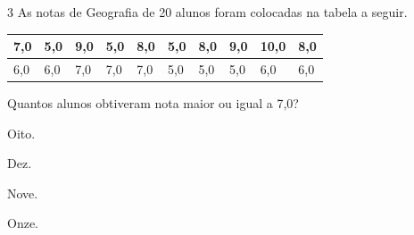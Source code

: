 



\num{3} As notas de Geografia de 20 alunos foram colocadas na tabela a seguir.


\begin{longtable}[]{@{}llllllllll@{}}
\toprule
7,0 & 5,0 & 9,0 & 5,0 & 8,0 & 5,0 & 8,0 & 9,0 & 10,0 &
8,0\tabularnewline
\midrule
\endhead
6,0 & 6,0 & 7,0 & 7,0 & 7,0 & 5,0 & 5,0 & 5,0 & 6,0 & 6,0\tabularnewline
\bottomrule
\end{longtable}

Quantos alunos obtiveram nota maior ou igual a 7,0?

\begin{escolha}
\item Oito.
\item Dez.
\item Nove.
\item Onze.
\end{escolha}







